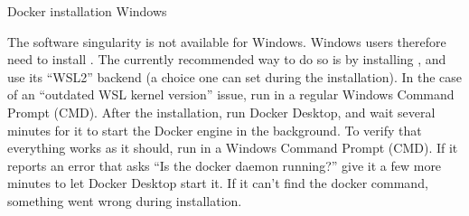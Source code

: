 \ignorespaces \begin{findoutmore}[label={index-1}, before title={\thetcbcounter\ }, check odd page=true]{Docker installation Windows}
\label{\detokenize{basics/101-133-containersrun:index-1}}

\sphinxAtStartPar
The software singularity is not available for Windows.
Windows users therefore need to install {\hyperref[\detokenize{glossary:term-Docker}]{}}.
The currently recommended way to do so is by installing , and use its “WSL2” backend (a choice one can set during the installation).
In the case of an “outdated WSL kernel version” issue, run  in a regular Windows Command Prompt (CMD).
After the installation, run Docker Desktop, and wait several minutes for it to start the Docker engine in the background.
To verify that everything works as it should, run  in a Windows Command Prompt (CMD).
If it reports an error that asks “Is the docker daemon running?” give it a few more minutes to let Docker Desktop start it.
If it can’t find the docker command, something went wrong during installation.


\end{findoutmore}

\ignorespaces 

